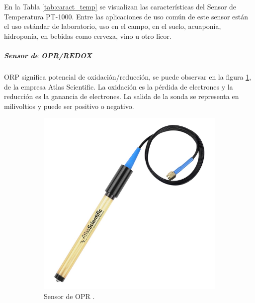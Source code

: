 En la Tabla \ref{tab:caract_temp} se visualizan las características del Sensor de Temperatura PT-1000.
Entre las aplicaciones de uso común de este sensor están el uso est\'andar de laboratorio, uso en el campo, en el suelo, acuapon\'ia, hidroponía, en bebidas como cerveza, vino u otro licor.

\subparagraph{Sensor de OPR/REDOX}
ORP significa potencial de oxidación/reducci\'on, se puede observar en la figura \ref{fig:sensorOPR}, de la empresa Atlas Scientific. La oxidación es la pérdida de electrones y la reducción es la ganancia de electrones. La salida de la sonda se representa en milivoltios y puede ser positivo o negativo.

\begin{figure}[H]
\caption[Sensor y EZO de OPR.]{Sensor y EZO de OPR de la empresa Atlas Scientific. }
     \centering
     \begin{subfigure}[b]{0.5\textwidth}
         \centering
         \includegraphics[width=\textwidth]{Imagenes/cap3/OPR_Sensor.jpg}
	    \caption[Sensor de OPR.]{Sensor de OPR . }
        \label{fig:sensorOPR}
     \end{subfigure}
     \hfill
     \begin{subfigure}[b]{0.35\textwidth}
         \centering

\end{subfigure}
\end{figure}
